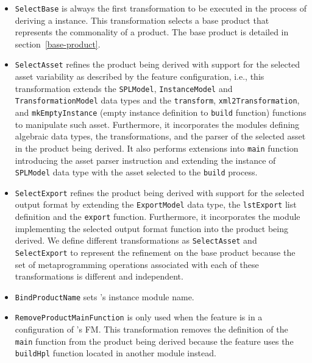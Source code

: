 \begin{itemize}

\item \texttt{SelectBase} is always the first transformation to be executed in the process of deriving a \hpl{} instance. This transformation selects a \hpl{} base product that represents the commonality of a \hpl{} product. The base product is detailed in section~\ref{base-product}.

\item \texttt{SelectAsset} refines the product being derived with support for the selected asset variability as described by the feature configuration, i.e., this transformation extends the \texttt{SPLModel}, \texttt{InstanceModel} and \texttt{TransformationModel} data types and the \texttt{transform}, \texttt{xml2Transformation}, and \texttt{mkEmptyInstance} (empty instance definition to \texttt{build} function) functions to manipulate such asset. Furthermore, it incorporates the modules defining algebraic data types, the transformations, and the parser of the selected asset in the product being derived.  It also performs extensions into \texttt{main} function introducing the asset parser instruction and extending the instance of \texttt{SPLModel} data type with the asset selected to the \texttt{build} process.

\item \texttt{SelectExport} refines the product being derived with support for the selected output format by extending the \texttt{ExportModel} data type, the \texttt{lstExport} list definition and the \texttt{export} function. Furthermore, it incorporates the module implementing the selected output format function into the product being derived. We define different transformations as \texttt{SelectAsset} and \texttt{SelectExport} to represent the refinement on the base product because the set of metaprogramming operations associated with each of these \hpl{} transformations is different and independent.

\item \texttt{BindProductName} sets \hpl{}'s instance module name.

\item \texttt{RemoveProductMainFunction} is only used when the \hp{} feature is in a configuration of \hpl's FM. This transformation removes the definition of the \texttt{main} function from the product being derived because the \hp{} feature uses the \texttt{buildHpl} function located in another module instead.


\end{itemize}
